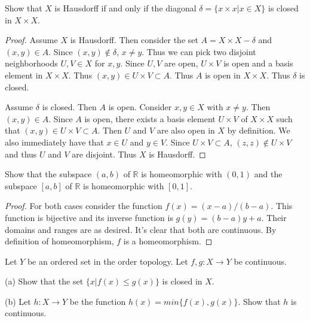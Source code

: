 \documentclass[12pt]{article}
\newenvironment{problem}[2][Problem]
{
	\begin{trivlist} 
		\item[\hskip \labelsep {\bfseries #1 #2:}]
	}
{
	\end{trivlist}
	}
\begin{document}
\begin{problem}{17.13}
Show that $X$ is Hausdorff if and only if the diagonal $\delta = \{x \times x | x \in X\}$ is closed in $X \times X$.
\end{problem}
\begin{proof}
Assume $X$ is Hausdorff. Then consider the set $A = X \times X - \delta$ and $(x, y) \in A$. Since $(x, y) \not\in \delta$, $x \neq y$. Thus we can pick two disjoint neighborhoods $U, V \in X$ for $x, y$. Since $U, V$ are open, $U \times V$ is open and a basis element in $X \times X$. Thus $(x, y) \in U \times V \subset A$. Thus $A$ is open in $X \times X$. Thus $\delta$ is closed.

Assume $\delta$ is closed. Then $A$ is open. Consider $x, y \in X$ with $x \neq y$. Then $(x, y) \in A$. Since $A$ is open, there exists a basis element $U \times V$ of $X \times X$ such that $(x, y) \in U \times V \subset A$. Then $U$ and $V$ are also open in $X$ by definition. We also immediately have that $x \in U$ and $y \in V$. Since $U \times V \subset A$, $(z, z) \not\in U \times V$ and thus $U$ and $V$ are disjoint. Thus $X$ is Hausdorff.
\end{proof}

\newpage
\begin{problem}{18.5}
Show that the subspace $(a, b)$ of $\mathbb{R}$ is homeomorphic with $(0, 1)$ and the subspace $[a, b]$ of $\mathbb{R}$ is homeomorphic with $[0, 1]$.
\end{problem}
\begin{proof}
For both cases consider the function $f(x) = (x-a)/(b-a)$. This function is bijective and its inverse function is $g(y) = (b-a)y + a$. Their domains and ranges are as desired. It's clear that both are continuous. By definition of homeomorphism, $f$ is a homeomorphism.
\end{proof}

\begin{problem}{18.8}
Let $Y$ be an ordered set in the order topology. Let $f, g: X \rightarrow Y$ be continuous.

(a) Show that the set $\{x | f(x) \leq g(x)\}$ is closed in $X$.

(b) Let $h: X \rightarrow Y$ be the function $h(x) = min\{f(x), g(x)\}$. Show that $h$ is continuous.
\end{problem}
\end{document}
